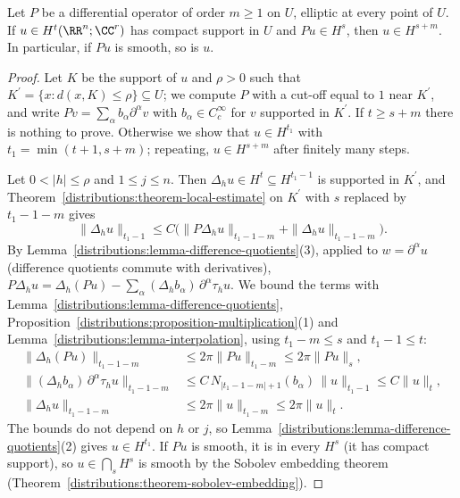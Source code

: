 \begin{theorem}\label{distributions:theorem-local-regularity}
Let $P$ be a differential operator of order $m \geq 1$ on $U$, elliptic at every point of $U$. If $u \in H^t(\RR^n; \CC^r)$ has compact support in $U$ and $Pu \in H^s$, then $u \in H^{s+m}$. In
particular, if $Pu$ is smooth, so is $u$.
\end{theorem}

\begin{proof}
Let $K$ be the support of $u$ and $\rho > 0$ such that $K^{\prime} = \{x : d(x, K) \leq \rho\} \subseteq U$; we compute $P$ with a cut-off equal to $1$ near $K^{\prime}$, and write $Pv = \sum_\alpha b_\alpha\partial^\alpha v$ with
$b_\alpha \in C_c^\infty$ for $v$ supported in $K^{\prime}$. If $t \geq s + m$ there is nothing to prove. Otherwise we show that $u \in H^{t_1}$ with $t_1 = \min(t + 1, s + m)$; repeating, $u \in H^{s+m}$ after finitely many steps.

Let $0 < |h| \leq \rho$ and $1 \leq j \leq n$. Then $\Delta_hu \in H^t \subseteq H^{t_1 - 1}$ is supported in $K^{\prime}$, and Theorem~\ref{distributions:theorem-local-estimate} on $K^{\prime}$ with $s$ replaced by
$t_1 - 1 - m$ gives
\[
\|\Delta_hu\|_{t_1 - 1} \leq C\bigl(\|P\Delta_hu\|_{t_1 - 1 - m} + \|\Delta_hu\|_{t_1 - 1 - m}\bigr).
\]
By Lemma~\ref{distributions:lemma-difference-quotients}(3), applied to $w = \partial^\alpha u$ (difference quotients commute with derivatives), $P\Delta_hu = \Delta_h(Pu) - \sum_\alpha(\Delta_hb_\alpha)\,\partial^\alpha\tau_hu$. We bound
the terms with Lemma~\ref{distributions:lemma-difference-quotients}, Proposition~\ref{distributions:proposition-multiplication}(1) and Lemma~\ref{distributions:lemma-interpolation}, using $t_1 - m \leq s$ and $t_1 - 1 \leq t$:
\[
\begin{aligned}
\|\Delta_h(Pu)\|_{t_1 - 1 - m} &\leq 2\pi\|Pu\|_{t_1 - m} \leq 2\pi\|Pu\|_s, \\
\|(\Delta_hb_\alpha)\,\partial^\alpha\tau_hu\|_{t_1 - 1 - m} &\leq C\,N_{|t_1 - 1 - m| + 1}(b_\alpha)\,\|u\|_{t_1 - 1} \leq C\|u\|_t, \\
\|\Delta_hu\|_{t_1 - 1 - m} &\leq 2\pi\|u\|_{t_1 - m} \leq 2\pi\|u\|_t .
\end{aligned}
\]
The bounds do not depend on $h$ or $j$, so Lemma~\ref{distributions:lemma-difference-quotients}(2) gives $u \in H^{t_1}$. If $Pu$ is smooth, it is in every $H^s$ (it has compact support), so $u \in \bigcap_sH^s$
is smooth by the Sobolev embedding theorem (Theorem~\ref{distributions:theorem-sobolev-embedding}).
\end{proof}

